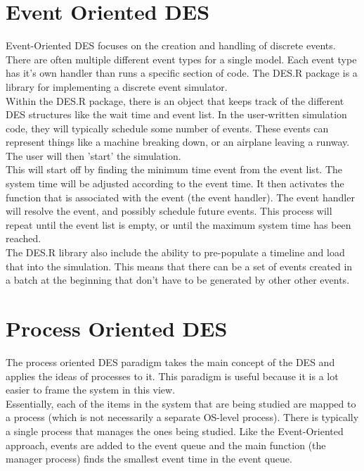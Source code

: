 \documentclass[fleqn]{article}
\begin{document}
\section{Event Oriented DES}
Event-Oriented DES focuses on the creation and handling of discrete events. There are often multiple different event types for a single model. Each event type has it's own handler than runs a specific section of code. The DES.R package is a library for implementing a discrete event simulator.\\

Within the DES.R package, there is an object that keeps track of the different DES structures like the wait time and event list. In the user-written simulation code, they will typically schedule some number of events. These events can represent things like a machine breaking down, or an airplane leaving a runway. The user will then 'start' the simulation. \\

This will start off by finding the minimum time event from the event list. The system time will be adjusted according to the event time. It then activates the function that is associated with the event (the event handler). The event handler will resolve the event, and possibly schedule future events. This process will repeat until the event list is empty, or until the maximum system time has been reached. \\

The DES.R library also include the ability to pre-populate a timeline and load that into the simulation. This means that there can be a set of events created in a batch at the beginning that don't have to be generated by other other events.

\section{Process Oriented DES}
The process oriented DES paradigm takes the main concept of the DES and applies the ideas of processes to it. This paradigm is useful because it is a lot easier to frame the system in this view.\\

Essentially, each of the items in the system that are being studied are mapped to a process (which is not necessarily a separate OS-level process). There is typically a single process that manages the ones being studied. Like the Event-Oriented approach, events are added to the event queue and the main function (the manager process) finds the smallest event time in the event queue.\\
\end{document}
